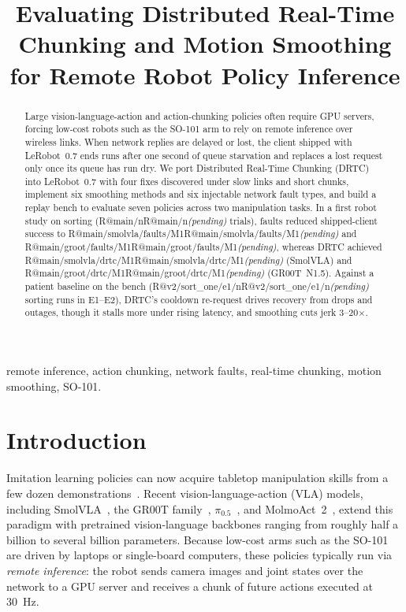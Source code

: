 \documentclass[conference]{IEEEtran}
\makeatletter
\newcommand{\R}[1]{\ifcsname R@#1\endcsname\csname R@#1\endcsname\else\textit{(pending)}\fi}
\newcommand{\drtc}{DRTC}
\newcommand{\smolvla}{SmolVLA}
\newcommand{\groot}{GR00T~N1.5}
\newcommand{\pizerofive}{$\pi_{0.5}$}
\makeatother
\begin{document}
\title{Evaluating Distributed Real-Time Chunking and Motion Smoothing for Remote Robot Policy Inference}

\author{}

\maketitle

\begin{abstract}
Large vision-language-action and action-chunking policies often require GPU servers, forcing low-cost robots such as the SO-101 arm to rely on remote inference over wireless links. When network replies are delayed or lost, the client shipped with LeRobot~0.7 ends runs after one second of queue starvation and replaces a lost request only once its queue has run dry. We port Distributed Real-Time Chunking (\drtc{}) into LeRobot~0.7 with four fixes discovered under slow links and short chunks, implement six smoothing methods and six injectable network fault types, and build a replay bench to evaluate seven policies across two manipulation tasks. In a first robot study on sorting (\R{main/n} trials), faults reduced shipped-client success to \R{main/smolvla/faults/M1} and \R{main/groot/faults/M1}, whereas \drtc{} achieved \R{main/smolvla/drtc/M1} (\smolvla{}) and \R{main/groot/drtc/M1} (\groot{}). Against a patient baseline on the bench (\R{v2/sort_one/e1/n} sorting runs in E1--E2), \drtc's cooldown re-request drives recovery from drops and outages, though it stalls more under rising latency, and smoothing cuts jerk 3--20$\times$.
\end{abstract}

\begin{IEEEkeywords}
remote inference, action chunking, network faults, real-time chunking, motion smoothing, SO-101.
\end{IEEEkeywords}

\section{Introduction}

Imitation learning policies can now acquire tabletop manipulation skills from a few dozen demonstrations~\cite{zhao2023act,chi2023diffusion}. Recent vision-language-action (VLA) models, including \smolvla~\cite{shukor2025smolvla}, the GR00T family~\cite{nvidia2025gr00t}, \pizerofive~\cite{pi2025pi05}, and MolmoAct~2~\cite{molmoact2}, extend this paradigm with pretrained vision-language backbones ranging from roughly half a billion to several billion parameters. Because low-cost arms such as the SO-101~\cite{so101} are driven by laptops or single-board computers, these policies typically run via \emph{remote inference}: the robot sends camera images and joint states over the network to a GPU server and receives a chunk of future actions executed at 30~Hz.
\end{document}
